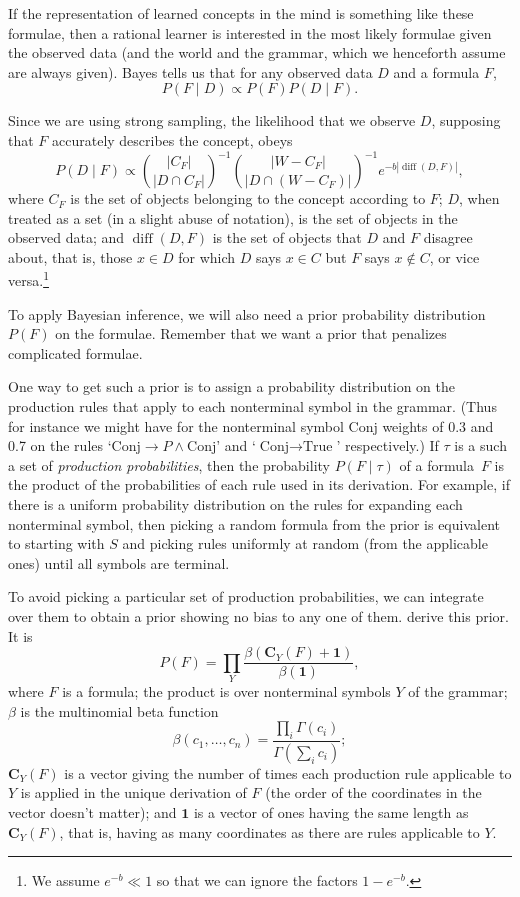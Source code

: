 \documentclass[jou,apacite]{apa6}
\newcommand{\Conj}{\text{Conj}}
\newcommand{\True}{\text{True}}
\DeclareMathOperator{\diff}{diff}
\begin{document}
If the representation of learned concepts in the mind is
something like these formulae, then a rational
learner is interested in the most
likely formulae given the observed data (and the world and the grammar,
which we henceforth assume are always given). Bayes tells us that
for any observed data $D$ and a formula $F$,
\[P(F\mid D) \propto P(F) P(D\mid F). \]

Since we are using strong sampling, the likelihood that we observe $D$,
supposing that $F$ accurately describes the concept,
obeys
\[P(D\mid F) \propto \binom{|C_F|}{|D \cap C_F|}^{-1}
	\binom{|W- C_F|}{|D \cap (W- C_F)|}^{-1}
	e^{-b |\diff(D, F)|}, \]
where $C_F$ is the set of objects belonging to the concept
according to $F$;
$D$, when treated as a set (in a slight abuse of notation),
is the set of objects in the observed data;
and $\diff(D, F)$ is the set of objects that $D$ and $F$ disagree about,
that is, those $x\in D$ for which $D$ says $x\in C$ 
but $F$ says $x\notin C$,
or vice versa.\footnote{We assume $e^{-b} \ll 1$ so that we can ignore
the factors $1-e^{-b}$.}

 To apply
Bayesian inference, we will also need a prior probability distribution
$P(F)$
on the formulae. Remember that we want a prior that penalizes
complicated formulae.

One way to get such a prior is to
assign a probability distribution on the production rules that apply
to each nonterminal symbol in the grammar.
(Thus for instance we might have for the nonterminal symbol $\text{Conj}$
weights of 0.3 and 0.7 on the rules 
	`$\Conj \to P \wedge \Conj$'
and
	`$\Conj \to \True$'
respectively.)
If $\tau$ is a such a set of \emph{production probabilities},
  then the probability $P(F\mid \tau)$ of a
formula~$F$ is the product of the probabilities of each rule used
in its derivation. For example, if there is a uniform probability
distribution on the rules for expanding each nonterminal symbol,
then picking a random formula from the prior is equivalent to
starting with $S$ and picking rules uniformly at random (from 
the applicable ones) until all symbols are terminal. 

To avoid picking a particular set of production probabilities,
we can integrate over them to obtain a prior showing no 
bias to any one of them. \citet{rrdnf} derive this prior. It is
\[P(F) = \prod_Y
	\frac{\beta(\mathbf{C}_Y(F) + \mathbf{1})}{\beta(\mathbf{1})},\]
where $F$ is a formula; the product is over nonterminal symbols $Y$
of the grammar; $\beta$ is the multinomial beta function
\[\beta(c_1,\ldots,c_n) = \frac{\prod_i\Gamma(c_i)}{\Gamma(\sum_i c_i)};\]
$\mathbf{C}_Y(F)$ is a vector  
giving the number of times each production rule
applicable to $Y$ is applied in the unique derivation of $F$ (the order
of the coordinates in the vector doesn't matter); and $\mathbf{1}$ is a
vector of ones having the same length as $\mathbf{C}_Y(F)$, that is,
having as many coordinates as there are rules applicable to $Y$.
\end{document}
